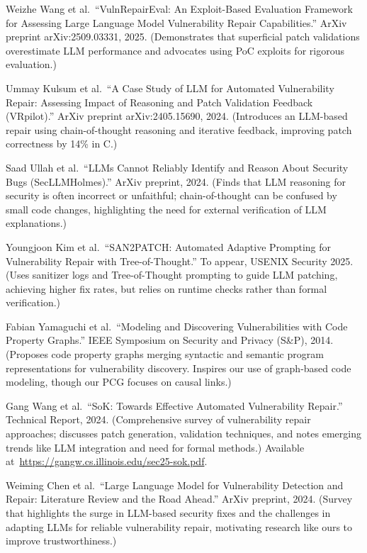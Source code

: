 \documentclass[conference,compsoc]{IEEEtran}
\begin{document}
\begin{thebibliography}{99}
 Weizhe Wang et al.~``VulnRepairEval: An Exploit-Based Evaluation
Framework for Assessing Large Language Model Vulnerability Repair
Capabilities.'' ArXiv preprint arXiv:2509.03331, 2025. (Demonstrates
that superficial patch validations overestimate LLM performance and
advocates using PoC exploits for rigorous evaluation.)

 Ummay Kulsum et al.~``A Case Study of LLM for Automated Vulnerability
Repair: Assessing Impact of Reasoning and Patch Validation Feedback
(VRpilot).'' ArXiv preprint arXiv:2405.15690, 2024. (Introduces an
LLM-based repair using chain-of-thought reasoning and iterative
feedback, improving patch correctness by 14\% in C.)

 Saad Ullah et al.~``LLMs Cannot Reliably Identify and Reason About
Security Bugs (SecLLMHolmes).'' ArXiv preprint, 2024. (Finds that LLM
reasoning for security is often incorrect or unfaithful;
chain-of-thought can be confused by small code changes, highlighting the
need for external verification of LLM explanations.)

 Youngjoon Kim et al.~``SAN2PATCH: Automated Adaptive Prompting for
Vulnerability Repair with Tree-of-Thought.'' To appear, USENIX Security
2025. (Uses sanitizer logs and Tree-of-Thought prompting to guide LLM
patching, achieving higher fix rates, but relies on runtime checks
rather than formal verification.)

 Fabian Yamaguchi et al.~``Modeling and Discovering Vulnerabilities with
Code Property Graphs.'' IEEE Symposium on Security and Privacy (S\&P),
2014. (Proposes code property graphs merging syntactic and semantic
program representations for vulnerability discovery. Inspires our use of
graph-based code modeling, though our PCG focuses on causal links.)

 Gang Wang et al.~``SoK: Towards Effective Automated Vulnerability
Repair.'' Technical Report, 2024. (Comprehensive survey of vulnerability
repair approaches; discusses patch generation, validation techniques,
and notes emerging trends like LLM integration and need for formal
methods.) Available at~\url{https://gangw.cs.illinois.edu/sec25-sok.pdf}.

 Weiming Chen et al.~``Large Language Model for Vulnerability Detection
and Repair: Literature Review and the Road Ahead.'' ArXiv preprint,
2024. (Survey that highlights the surge in LLM-based security fixes and
the challenges in adapting LLMs for reliable vulnerability repair,
motivating research like ours to improve trustworthiness.)


\end{thebibliography}
\end{document}
